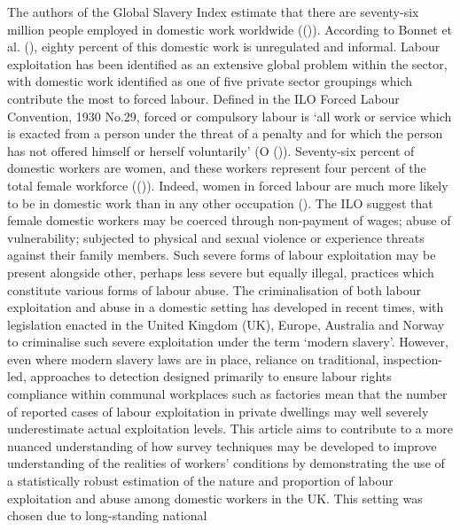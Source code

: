 \documentclass[
  12pt,
]{article}
\theoremstyle{plain}
\theoremstyle{definition}
\begin{document}
The authors of the Global Slavery Index estimate that there are
seventy-six million people employed in domestic work worldwide
(()).
According to Bonnet et al. (),
eighty percent of this domestic work is unregulated and informal. Labour
exploitation has been identified as an extensive global problem within
the sector, with domestic work identified as one of five private sector
groupings which contribute the most to forced labour. Defined in the ILO
Forced Labour Convention, 1930 No.29, forced or compulsory labour is
`all work or service which is exacted from a person under the threat of
a penalty and for which the person has not offered himself or herself
voluntarily' (O ()). Seventy-six
percent of domestic workers are women, and these workers represent four
percent of the total female workforce
(()).
Indeed, women in forced labour are much more likely to be in domestic
work than in any other occupation
().
The ILO suggest that female domestic workers may be coerced through
non-payment of wages; abuse of vulnerability; subjected to physical and
sexual violence or experience threats against their family members. Such
severe forms of labour exploitation may be present alongside other,
perhaps less severe but equally illegal, practices which constitute
various forms of labour abuse. The criminalisation of both labour
exploitation and abuse in a domestic setting has developed in recent
times, with legislation enacted in the United Kingdom (UK), Europe,
Australia and Norway to criminalise such severe exploitation under the
term `modern slavery'. However, even where modern slavery laws are in
place, reliance on traditional, inspection-led, approaches to detection
designed primarily to ensure labour rights compliance within communal
workplaces such as factories mean that the number of reported cases of
labour exploitation in private dwellings may well severely underestimate
actual exploitation levels. This article aims to contribute to a more
nuanced understanding of how survey techniques may be developed to
improve understanding of the realities of workers' conditions by
demonstrating the use of a statistically robust estimation of the nature
and proportion of labour exploitation and abuse among domestic workers
in the UK. This setting was chosen due to long-standing national
\end{document}
